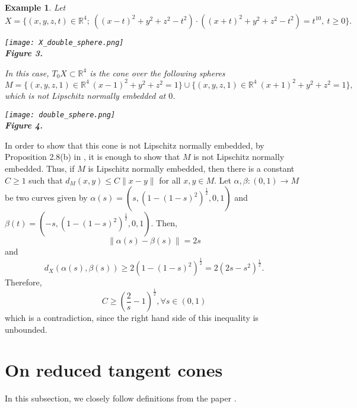\documentclass{amsart}
\makeatletter
\newtheorem{example}[theorem]{Example}
\newcommand{\R}{\mathbb{R}}
\newcommand{\mlabel}[2]{\def\@currentlabel{#2}\label{#1}} %
\makeatother
\begin{document}
\begin{example}\label{2.8}
 Let $$X=\{(x,y,z,t)\in \R^4; \ ((x-t)^2+y^2+z^2-t^2)\cdot ((x+t)^2+y^2+z^2-t^2)=t^{10}, \ t\geq 0\}.$$
\begin{center}\mlabel{X_double_spheres}{3}
\texttt{[image: X\_double\_sphere.png]}\\
{\bf Figure 3.}
\end{center}
In this case, $T_0X\subset\R^4$ is the cone over the following spheres
$$M=\{ (x,y,z,1)\in\R^4 \ (x-1)^2+y^2+z^2=1\} \cup \{ (x,y,z,1)\in\R^4 \ (x+1)^2+y^2+z^2=1\},$$ which is not Lipschitz normally embedded at $0$.
\begin{center}\mlabel{double_spheres}{4}
\texttt{[image: double\_sphere.png]}\\
{\bf Figure 4.}
\end{center}
\end{example}
In order to show that this cone is not Lipschitz normally embedded, by Proposition 2.8(b) in \cite{KernerPR:2017}, it is enough to show that $M$ is not Lipschitz normally embedded. Thus, if $M$ is Lipschitz normally embedded, then there is a constant $C\geq 1$ such that $d_M(x,y)\leq C\|x-y\|$ for all $x,y\in M$. Let $\alpha, \beta:(0,1)\to M$ be two curves given by $\alpha(s)=(s,(1-(1-s)^2)^{\frac{1}{2}},0,1)$ and $\beta(t)=(-s,(1-(1-s)^2)^{\frac{1}{2}},0,1)$. 
Then,
$$
\|\alpha(s)-\beta(s)\|=2s
$$
and
$$
d_X(\alpha(s),\beta(s))\geq 2(1-(1-s)^2)^{\frac{1}{2}}=2(2s-s^2)^{\frac{1}{2}}.
$$
Therefore, 
$$
C\geq (\frac{2}{s}-1)^{\frac{1}{2}}, \forall s\in (0,1)
$$
which is a contradiction, since the right hand side of this inequality is unbounded.









\section{On reduced tangent cones}

In this subsection, we closely follow definitions from the paper \cite{BirbrairFG:2017}.
\end{document}
